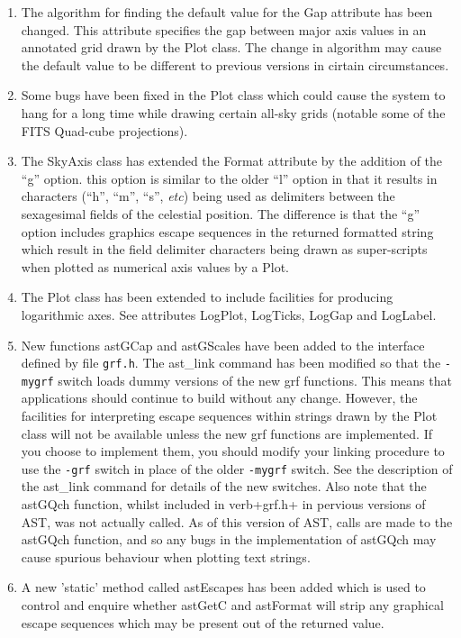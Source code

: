 \documentclass[twoside,11pt]{article}
\begin{document}
\begin{enumerate}
\item The algorithm for finding the default value for the Gap attribute
has been changed. This attribute specifies the gap between major axis
values in an annotated grid drawn by the Plot class. The change in
algorithm may cause the default value to be different to previous versions
in cirtain circumstances.

\item Some bugs have been fixed in the Plot class which could cause the
system to hang for a long time while drawing certain all-sky grids
(notable some of the FITS Quad-cube projections).

\item The SkyAxis class has extended the Format attribute by the addition
of the ``g'' option. this option is similar to the older ``l'' option in that
it results in characters (``h'', ``m'', ``s'', \emph{etc}) being used as
delimiters between the sexagesimal fields of the celestial position. The
difference is that the ``g'' option includes graphics escape sequences
in the returned formatted string which result in the field delimiter
characters being drawn as super-scripts when plotted as numerical axis values
by a Plot.

\item The Plot class has been extended to include facilities for producing
logarithmic axes. See attributes LogPlot, LogTicks, LogGap and LogLabel.

\item New functions astGCap and astGScales have been added to the interface
defined by file \verb+grf.h+. The ast\_link command has been modified so
that the \verb+-mygrf+ switch loads dummy versions of the new grf
functions. This means that applications should continue to build without
any change. However, the facilities for interpreting escape sequences
within strings drawn by the Plot class will not be available unless the
new grf functions are implemented. If you choose to implement them, you
should modify your linking procedure to use the \verb+-grf+ switch in
place of the older \verb+-mygrf+ switch. See the description of the ast\_link
command for details of the new switches. Also note that the astGQch
function, whilst included in verb+grf.h+ in pervious versions of AST, was
not actually called. As of this version of AST, calls are made to the
astGQch function, and so any bugs in the implementation of astGQch may
cause spurious behaviour when plotting text strings.

\item A new 'static' method called astEscapes has been added which is used
to control and enquire whether astGetC and astFormat will strip any graphical
escape sequences which may be present out of the returned value.


\end{enumerate}
\end{document}
